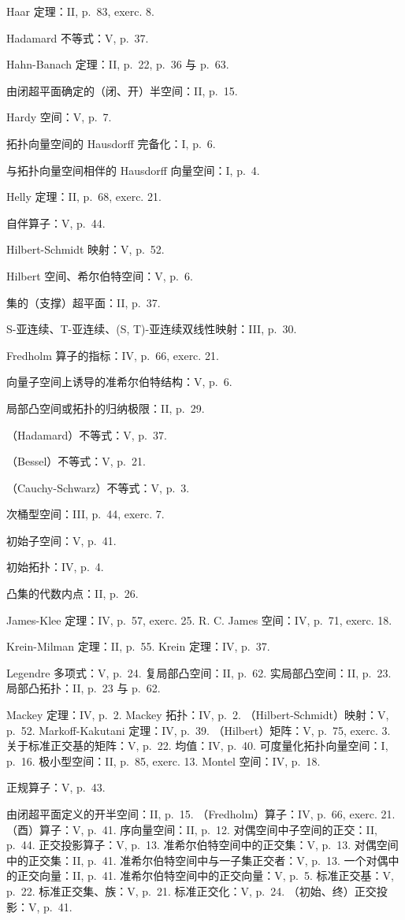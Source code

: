 Haar 定理：II, p.~83, exerc. 8.

Hadamard 不等式：V, p.~37.

Hahn-Banach 定理：II, p.~22, p.~36 与 p.~63.

由闭超平面确定的（闭、开）半空间：II, p.~15.

Hardy 空间：V, p.~7.

拓扑向量空间的 Hausdorff 完备化：I, p.~6.

与拓扑向量空间相伴的 Hausdorff 向量空间：I, p.~4.

Helly 定理：II, p.~68, exerc. 21.

自伴算子：V, p.~44.

Hilbert-Schmidt 映射：V, p.~52.

Hilbert 空间、希尔伯特空间：V, p.~6.

集的（支撑）超平面：II, p.~37.

S-亚连续、T-亚连续、(S, T)-亚连续双线性映射：III, p.~30.

Fredholm 算子的指标：IV, p.~66, exerc. 21.

向量子空间上诱导的准希尔伯特结构：V, p.~6.

局部凸空间或拓扑的归纳极限：II, p.~29.

（Hadamard）不等式：V, p.~37.

（Bessel）不等式：V, p.~21.

（Cauchy-Schwarz）不等式：V, p.~3.

次桶型空间：III, p.~44, exerc. 7.

初始子空间：V, p.~41.

初始拓扑：IV, p.~4.

凸集的代数内点：II, p.~26.

James-Klee 定理：IV, p.~57, exerc. 25. R. C. James 空间：IV, p.~71, exerc. 18.

Krein-Milman 定理：II, p.~55. Krein 定理：IV, p.~37.

Legendre 多项式：V, p.~24. 复局部凸空间：II, p.~62. 实局部凸空间：II, p.~23. 局部凸拓扑：II, p.~23 与 p.~62.

Mackey 定理：IV, p.~2. Mackey 拓扑：IV, p.~2. （Hilbert-Schmidt）映射：V, p.~52. Markoff-Kakutani 定理：IV, p.~39. （Hilbert）矩阵：V, p.~75, exerc. 3. 关于标准正交基的矩阵：V, p.~22. 均值：IV, p.~40. 可度量化拓扑向量空间：I, p.~16. 极小型空间：II, p.~85, exerc. 13. Montel 空间：IV, p.~18.

正规算子：V, p.~43.

由闭超平面定义的开半空间：II, p.~15. （Fredholm）算子：IV, p.~66, exerc. 21. （酉）算子：V, p.~41. 序向量空间：II, p.~12. 对偶空间中子空间的正交：II, p.~44. 正交投影算子：V, p.~13. 准希尔伯特空间中的正交集：V, p.~13. 对偶空间中的正交集：II, p.~41. 准希尔伯特空间中与一子集正交者：V, p.~13. 一个对偶中的正交向量：II, p.~41. 准希尔伯特空间中的正交向量：V, p.~5. 标准正交基：V, p.~22. 标准正交集、族：V, p.~21. 标准正交化：V, p.~24. （初始、终）正交投影：V, p.~41.

